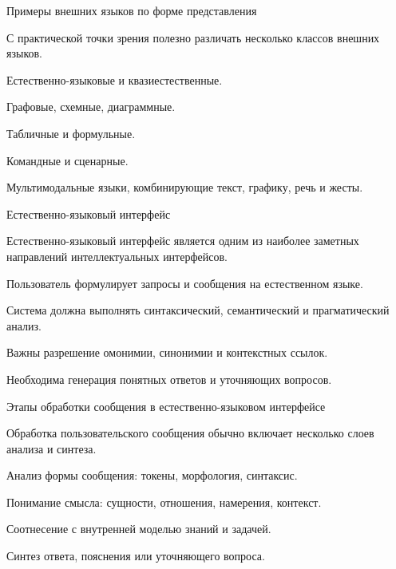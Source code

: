 \begin{frame}{Примеры внешних языков по форме представления}
	\topline
	\justifying

	С практической точки зрения полезно различать несколько классов внешних языков.
	
	\begin{textitemize}
		\item Естественно-языковые и квазиестественные.
		\item Графовые, схемные, диаграммные.
		\item Табличные и формульные.
		\item Командные и сценарные.
		\item Мультимодальные языки, комбинирующие текст, графику, речь и жесты.
	\end{textitemize}
\end{frame}

\begin{frame}{Естественно-языковый интерфейс}
	\topline
	\justifying

	Естественно-языковый интерфейс является одним из наиболее заметных направлений интеллектуальных интерфейсов.
	
	\begin{textitemize}
		\item Пользователь формулирует запросы и сообщения на естественном языке.
		\item Система должна выполнять синтаксический, семантический и прагматический анализ.
		\item Важны разрешение омонимии, синонимии и контекстных ссылок.
		\item Необходима генерация понятных ответов и уточняющих вопросов.
	\end{textitemize}
\end{frame}

\begin{frame}{Этапы обработки сообщения в естественно-языковом интерфейсе}
	\topline
	\justifying

	Обработка пользовательского сообщения обычно включает несколько слоев анализа и синтеза.
	
	\begin{textitemize}
		\item Анализ формы сообщения: токены, морфология, синтаксис.
		\item Понимание смысла: сущности, отношения, намерения, контекст.
		\item Соотнесение с внутренней моделью знаний и задачей.
		\item Синтез ответа, пояснения или уточняющего вопроса.
	\end{textitemize}
\end{frame}

